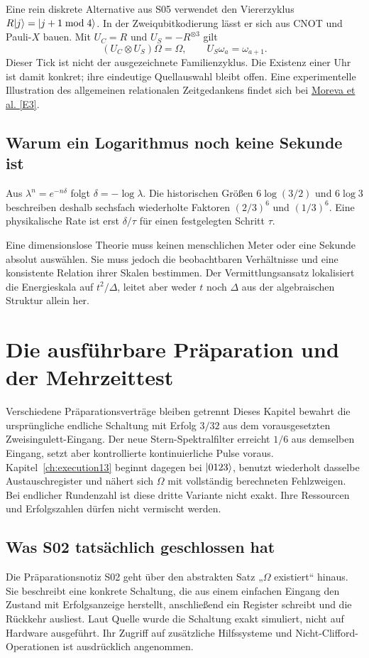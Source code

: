 Eine rein diskrete Alternative aus S05 verwendet den Viererzyklus $R\lvert j\rangle=\lvert j+1\bmod4\rangle$. In der Zweiqubitkodierung lässt er sich aus CNOT und Pauli-$X$ bauen. Mit $U_C=R$ und $U_S=-R^{\otimes3}$ gilt
\begin{equation}
(U_C\otimes U_S)\Omega=\Omega,\qquad U_S\omega_a=\omega_{a+1}.
\end{equation}
Dieser Tick ist nicht der ausgezeichnete Familienzyklus. Die Existenz einer Uhr ist damit konkret; ihre eindeutige Quellauswahl bleibt offen. Eine experimentelle Illustration des allgemeinen relationalen Zeitgedankens findet sich bei \href{https://arxiv.org/abs/1310.4691}{Moreva et al. [E3]}.

\section{Warum ein Logarithmus noch keine Sekunde ist}
Aus $\lambda^n=e^{-n\delta}$ folgt $\delta=-\log\lambda$. Die historischen Größen $6\log(3/2)$ und $6\log3$ beschreiben deshalb sechsfach wiederholte Faktoren $(2/3)^6$ und $(1/3)^6$. Eine physikalische Rate ist erst $\delta/\tau$ für einen festgelegten Schritt $\tau$.

Eine dimensionslose Theorie muss keinen menschlichen Meter oder eine Sekunde absolut auswählen. Sie muss jedoch die beobachtbaren Verhältnisse und eine konsistente Relation ihrer Skalen bestimmen. Der Vermittlungsansatz lokalisiert die Energieskala auf $t^2/\Delta$, leitet aber weder $t$ noch $\Delta$ aus der algebraischen Struktur allein her.

\chapter{Die ausführbare Präparation und der Mehrzeittest}
\label{ch:echo}
\begin{bild}{Verschiedene Präparationsverträge bleiben getrennt}
Dieses Kapitel bewahrt die ursprüngliche endliche Schaltung mit Erfolg $3/32$ aus dem vorausgesetzten Zweisingulett-Eingang. Der neue Stern-Spektralfilter erreicht $1/6$ aus demselben Eingang, setzt aber kontrollierte kontinuierliche Pulse voraus. Kapitel~\ref{ch:execution13} beginnt dagegen bei $\lvert0123\rangle$, benutzt wiederholt dasselbe Austauschregister und nähert sich $\Omega$ mit vollständig berechneten Fehlzweigen. Bei endlicher Rundenzahl ist diese dritte Variante nicht exakt. Ihre Ressourcen und Erfolgszahlen dürfen nicht vermischt werden.
\end{bild}
\section{Was S02 tatsächlich geschlossen hat}
Die Präparationsnotiz S02 geht über den abstrakten Satz „$\Omega$ existiert“ hinaus. Sie beschreibt eine konkrete Schaltung, die aus einem einfachen Eingang den Zustand mit Erfolgsanzeige herstellt, anschließend ein Register schreibt und die Rückkehr ausliest. Laut Quelle wurde die Schaltung exakt simuliert, nicht auf Hardware ausgeführt. Ihr Zugriff auf zusätzliche Hilfssysteme und Nicht-Clifford-Operationen ist ausdrücklich angenommen.

